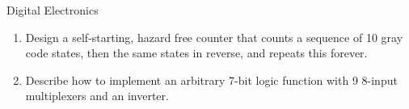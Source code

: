 \documentclass{tripos}
\begin{document}
\begin{question}[MockIA,year=2025,paper=1,question=3,author=nobody]{Digital Electronics}

\begin{enumerate}
\item Design a self-starting, hazard free counter that counts a sequence of 10 gray code states, then the same states in reverse, and repeats this forever. 
\item Describe how to implement an arbitrary 7-bit logic function with 9 8-input multiplexers and an inverter. 
  \end{enumerate}
  \eject
\end{question}
\end{document}
